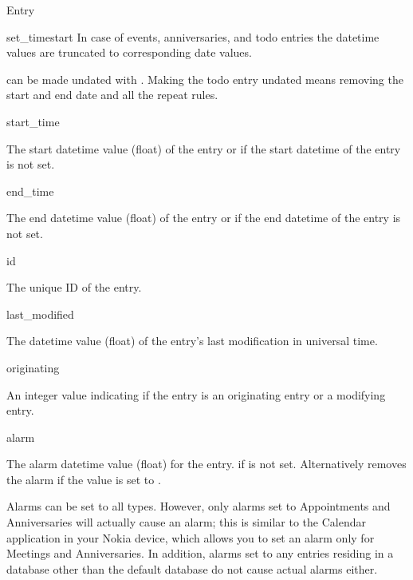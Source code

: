\begin{classdesc*}{Entry}
\begin{methoddesc}[Entry]{set_time}{start}
In case of events, anniversaries, and todo entries the datetime values are 
truncated to corresponding date values.

 can be made undated with 
. Making the todo entry undated means 
removing the start and end date and all the repeat rules.

\end{methoddesc}

\begin{memberdesc}[Entry]{start_time}

The start datetime value (float) of the entry or  if 
the start datetime of the entry is not set.

\end{memberdesc}

\begin{memberdesc}[Entry]{end_time}

The end datetime value (float) of the entry or  if the 
end datetime of the entry is not set.

\end{memberdesc}

\begin{memberdesc}[Entry]{id}

The unique ID of the entry.

\end{memberdesc}

\begin{memberdesc}[Entry]{last_modified}

The datetime value (float) of the entry's last modification in 
universal time.

\end{memberdesc}

\begin{memberdesc}[Entry]{originating}

An integer value indicating if the entry is an originating entry
or a modifying entry.

\end{memberdesc}

\begin{memberdesc}[Entry]{alarm}

The alarm datetime value (float) for the entry.  if  is 
not set. Alternatively removes the alarm if the value is set to . 

Alarms can be set to all  types. However, only alarms set to 
Appointments and Anniversaries will actually cause an alarm; this is similar 
to the Calendar application in your Nokia device, which allows you to set an 
alarm only for Meetings and Anniversaries. In addition, alarms set to any 
entries residing in a database other than the default database do not cause 
actual alarms either.


\end{memberdesc}
\end{classdesc*}
